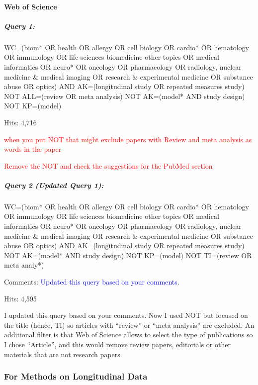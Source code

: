 \documentclass[
]{article}
\let\oldparagraph\paragraph
\renewcommand{\paragraph}[1]{\oldparagraph{#1}\mbox{}}
\let\oldsubparagraph\subparagraph
\renewcommand{\subparagraph}[1]{\oldsubparagraph{#1}\mbox{}}
\newcommand{\BN}[1]{\textcolor{red}{#1}}
\begin{document}
\hypertarget{web-of-science}{%
\paragraph{Web of Science}\label{web-of-science}}

\hypertarget{query-1}{%
\subparagraph{Query 1:}\label{query-1}}

WC=(biom* OR health OR allergy OR cell biology OR cardio* OR hematology
OR immunology OR life sciences biomedicine other topics OR medical
informatics OR neuro* OR oncology OR pharmacology OR radiology, nuclear
medicine \& medical imaging OR research \& experimental medicine OR
substance abuse OR optics) AND AK=(longitudinal study OR repeated
measures study) NOT ALL=(review OR meta analysis) NOT AK=(model* AND
study design) NOT KP=(model)

Hits: 4,716

\BN{when you put NOT that might exclude papers with Review and meta analysis as words in the paper}

\BN{Remove the NOT and check the suggestions for the PubMed section}

\hypertarget{query-2-updated-query-1}{%
\subparagraph{Query 2 (Updated Query
1):}\label{query-2-updated-query-1}}

WC=(biom* OR health OR allergy OR cell biology OR cardio* OR hematology
OR immunology OR life sciences biomedicine other topics OR medical
informatics OR neuro* OR oncology OR pharmacology OR radiology, nuclear
medicine \& medical imaging OR research \& experimental medicine OR
substance abuse OR optics) AND AK=(longitudinal study OR repeated
measures study) NOT AK=(model* AND study design) NOT KP=(model) NOT
TI=(review OR meta analy*)

Comments: \textcolor{blue}{Updated this query based on your comments}.

Hits: 4,595

I updated this query based on your comments. Now I used NOT but focused
on the title (hence, TI) so articles with ``review'' or ``meta
analysis'' are excluded. An additional filter is that Web of Science
allows to select the type of publications so I chose ``Article'', and
this would remove review papers, editorials or other materials that are
not research papers.

\hypertarget{for-methods-on-longitudinal-data}{%
\subsubsection{For Methods on Longitudinal
Data}\label{for-methods-on-longitudinal-data}}
\end{document}

